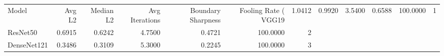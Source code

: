 \begin{tabular}{lrrrrrr}
\toprule
Model & Avg L2 & Median L2 & Avg Iterations & Boundary Sharpness & Fooling Rate (%
\midrule
VGG19 & 1.0412 & 0.9920 & 3.5400 & 0.6588 & 100.0000 & 1 \\
ResNet50 & 0.6915 & 0.6242 & 4.7500 & 0.4721 & 100.0000 & 2 \\
DenseNet121 & 0.3486 & 0.3109 & 5.3000 & 0.2245 & 100.0000 & 3 \\
\bottomrule
\end{tabular}
